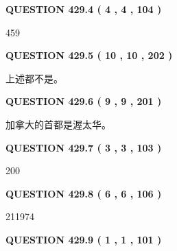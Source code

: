 \documentclass{ctexart}
\begin{document}
{\textbf{\Large{QUESTION
429.4 
 ( 4 , 4 , 104 )
}}}
  
  
 
 
\noindent{}

459
 
 
  
\vspace{0.2in}
  
{\textbf{\Large{QUESTION
429.5 
 ( 10 , 10 , 202 )
}}}
  
  
 
 
\noindent{}
 
 
 上述都不是。
 
 
 
 
  
\vspace{0.2in}
  
{\textbf{\Large{QUESTION
429.6 
 ( 9 , 9 , 201 )
}}}
  
  
 
 
\noindent{}
 
 
加拿大的首都是渥太华。
 
 
 
 
  
\vspace{0.2in}
  
{\textbf{\Large{QUESTION
429.7 
 ( 3 , 3 , 103 )
}}}
  
  
 
 
\noindent{}

200
 
 
  
\vspace{0.2in}
  
{\textbf{\Large{QUESTION
429.8 
 ( 6 , 6 , 106 )
}}}
  
  
 
 
\noindent{}

211974
 
 
  
\vspace{0.2in}
  
{\textbf{\Large{QUESTION
429.9 
 ( 1 , 1 , 101 )
}}}
  
\end{document}
